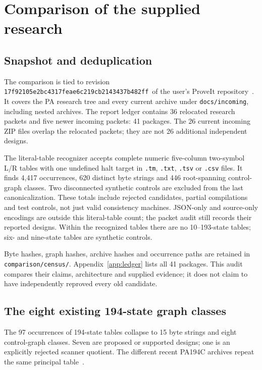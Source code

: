 \documentclass[11pt,letterpaper]{article}
\newcommand{\file}[1]{{\small\nolinkurl{#1}}}
\newcommand{\snapshot}{\texttt{17f92105e2bc4317feae6c219cb2143437b482ff}}
\begin{document}
\section{Comparison of the supplied research}
\label{sec:comparison}

\subsection{Snapshot and deduplication}

The comparison is tied to revision \snapshot\ of the user's ProveIt
repository~\cite{repo}. It covers the PA research tree and every
current archive under \file{docs/incoming}, including nested archives.
The report ledger contains 36 relocated research packets and five newer
incoming packets: 41 packages. The 26 current incoming ZIP files
overlap the relocated packets; they are not 26 additional independent
designs.

The literal-table recognizer accepts complete numeric five-column
two-symbol L/R tables with one undefined halt target in
\file{.tm}, \file{.txt}, \file{.tsv} or \file{.csv} files.
It finds 4,417 occurrences, 620 distinct byte strings and 446
root-spanning control-graph classes. Two disconnected synthetic controls
are excluded from the last canonicalization. These totals include
rejected candidates, partial compilations and test controls, not just
valid consistency machines. JSON-only and source-only encodings are
outside this literal-table count; the packet audit still records
their reported designs. Within the recognized tables there are no
10--193-state tables; six- and nine-state tables are synthetic controls.

Byte hashes, graph hashes, archive hashes and occurrence paths are
retained in \file{comparison/census/}. Appendix~\ref{app:ledger}
lists all 41 packages. This audit compares their claims, architecture
and supplied evidence; it does not claim to have independently reproved
every old candidate.

\subsection{The eight existing 194-state graph classes}

The 97 occurrences of 194-state tables collapse to 15 byte strings and
eight control-graph classes. Seven are proposed or supported designs;
one is an explicitly rejected scanner quotient. The different recent
PA194C archives repeat the same principal table~\cite{primary,cached}.
\end{document}
